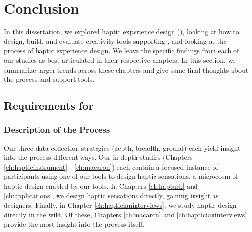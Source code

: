 \chapter{Conclusion}
\label{ch:conclusion}

In this dissertation, we explored haptic experience design (\haxd), looking at how to design, build, and evaluate creativity tools supporting \haxd, and looking at the process of haptic experience design.
We leave the specific findings from each of our studies as best articulated in their respective chapters.
In this section, we summarize larger trends across these chapters and give some final thoughts about the \haxd process and support tools.



%
%


%
%

\section{Requirements for \haxd}


\subsection{Description of the \haxd Process}
Our three data collection strategies (depth, breadth, ground) each yield insight into the \haxd process different ways.
Our in-depth studies (Chapters \ref{ch:hapticinstrument} - \ref{ch:macaron}) each contain a focused instance of participants using one of our tools to design haptic sensations, a microcosm of haptic design enabled by our tools.
In Chapters \ref{ch:hapturk} and \ref{ch:applications}, we design haptic sensations directly, gaining insight as designers.
Finally, in Chapter \ref{ch:hapticianinterviews}, we study haptic design directly in the wild.
Of these, Chapters \ref{ch:macaron} and \ref{ch:hapticianinterviews} provide the most insight into the process itself.



